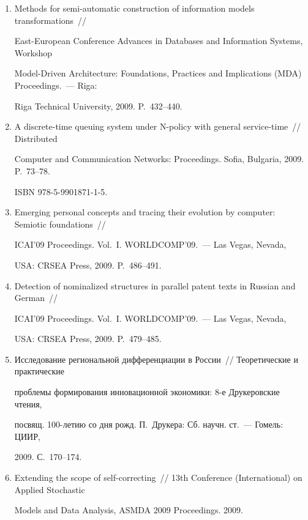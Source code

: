 \begin{enumerate}[1.]
\item{}


Methods for semi-automatic construction of information models transformations~// 


East-\linebreak European Conference Advances in Databases and Information Systems, Workshop 


Model-Driven Architecture: Foundations, Practices and Implications (MDA) Proceedings.~--- Riga: 


Riga Technical University, 2009. P.~432--440.





\item{}


A discrete-time queuing system under N-policy with general service-time~// Distributed 


Computer and Communication Networks: Proceedings. Sofia, Bulgaria, 2009. P.~73--78.


ISBN  978-5-9901871-1-5. 





\item{}


Emerging personal concepts and tracing their evolution by computer: Semiotic foundations~// 


ICAI'09 Proceedings. Vol.~I. WORLDCOMP'09.~--- Las Vegas, Nevada, 


USA: CRSEA Press, 2009. P.~486--491.





\item{}


Detection of nominalized structures in parallel patent texts in Russian and German~// 


ICAI'09 Proceedings. Vol.~I. WORLDCOMP'09.~--- Las Vegas, Nevada, 


USA: CRSEA Press, 2009. P.~479--485.





\item{}


Исследование региональной дифференциации в России~// Теоретические и практические 


проблемы формирования инновационной экономики: 8-е Друкеровские  чтения, 


посвящ. 100-летию со дня рожд. П.~Друкера: Сб. научн. ст.~--- Гомель: ЦИИР, 


2009. С.~170--174.





\item{}


Extending the scope of self-correcting~// 13th  Conference (International)  on Applied Stochastic 


Models and Data Analysis, ASMDA 2009 Proceedings. 2009.


\end{enumerate}
